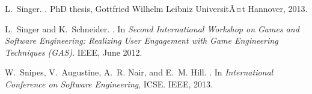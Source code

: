 \documentclass{sig-alternate}
\begin{document}
\begin{thebibliography}{10}
L.~Singer.
.
\newblock PhD thesis, Gottfried Wilhelm Leibniz UniversitÃ¤t Hannover, 2013.

L.~Singer and K.~Schneider.
.
\newblock In {\em Second International Workshop on Games and Software
  Engineering: Realizing User Engagement with Game Engineering Techniques
  (GAS)}. IEEE, June 2012.

W.~Snipes, V.~Augustine, A.~R. Nair, and E.~M. Hill.
.
\newblock In {\em International Conference on Software Engineering}, ICSE.
  IEEE, 2013.

\end{thebibliography}
\end{document}
